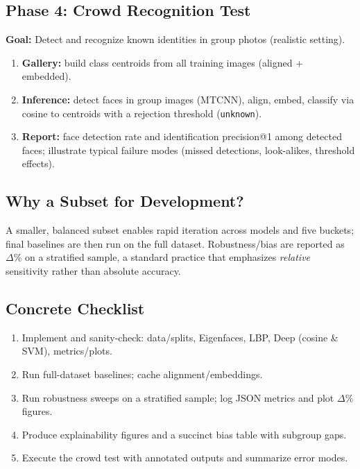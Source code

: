 \documentclass[a4paper]{article}
\begin{document}
\subsection*{Phase 4: Crowd Recognition Test}
\textbf{Goal:} Detect and recognize known identities in group photos (realistic setting).
\begin{enumerate}
  \item \textbf{Gallery:} build class centroids from all training images (aligned + embedded).
  \item \textbf{Inference:} detect faces in group images (MTCNN), align, embed, classify via cosine to centroids with a rejection threshold (\texttt{unknown}).
  \item \textbf{Report:} face detection rate and identification precision@1 among detected faces; illustrate typical failure modes (missed detections, look-alikes, threshold effects).
\end{enumerate}

\subsection*{Why a Subset for Development?}
A smaller, balanced subset enables rapid iteration across models and five buckets; final baselines are then run on the full dataset. Robustness/bias are reported as $\Delta\%$ on a stratified sample, a standard practice that emphasizes \emph{relative} sensitivity rather than absolute accuracy.

\subsection*{Concrete Checklist}
\begin{enumerate}
  \item Implement and sanity-check: data/splits, Eigenfaces, LBP, Deep (cosine \& SVM), metrics/plots.
  \item Run full-dataset baselines; cache alignment/embeddings.
  \item Run robustness sweeps on a stratified sample; log JSON metrics and plot $\Delta\%$ figures.
  \item Produce explainability figures and a succinct bias table with subgroup gaps.
  \item Execute the crowd test with annotated outputs and summarize error modes.
\end{enumerate}
\end{document}

